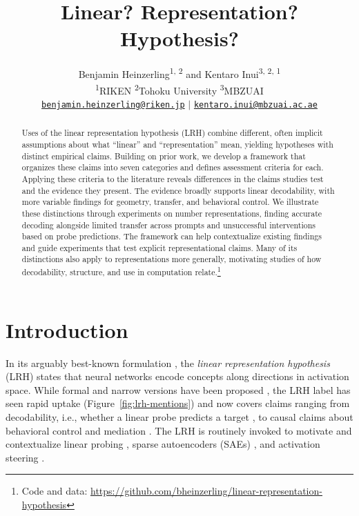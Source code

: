 \documentclass[11pt]{article}
\title{Linear? Representation? Hypothesis?}
\author{%
Benjamin Heinzerling\textsuperscript{\textnormal{1, 2}} \textnormal{and} Kentaro Inui\textsuperscript{\textnormal{3, 2, 1}} \\
\textsuperscript{\textnormal{1}}RIKEN \quad \textsuperscript{\textnormal{2}}Tohoku University \quad \textsuperscript{\textnormal{3}}MBZUAI \\
\hypersetup{urlcolor=black}\href{mailto:benjamin.heinzerling@riken.jp}{\tt benjamin.heinzerling@riken.jp} \hspace{0.06em} $\vert$ \hspace{0.12em} \href{mailto:kentaro.inui@mbzuai.ac.ae}{\tt kentaro.inui@mbzuai.ac.ae}%
}
\newcommand{\LRH}{LRH}
\begin{document}
\maketitle

\begin{abstract}
Uses of the linear representation hypothesis (LRH) combine different, often implicit assumptions about what ``linear'' and ``representation'' mean, yielding hypotheses with distinct empirical claims.
Building on prior work, we develop a framework that organizes these claims into seven categories and defines assessment criteria for each.
Applying these criteria to the literature reveals differences in the claims studies test and the evidence they present.
The evidence broadly supports linear decodability, with more variable findings for geometry, transfer, and behavioral control.
We illustrate these distinctions through experiments on number representations, finding accurate decoding alongside limited transfer across prompts and unsuccessful interventions based on probe predictions.
The framework can help contextualize existing findings and guide experiments that test explicit representational claims.
Many of its distinctions also apply to representations more generally, motivating studies of how decodability, structure, and use in computation relate.\footnote{Code and data: \url{https://github.com/bheinzerling/linear-representation-hypothesis}}
\end{abstract}

\section{Introduction}

In its arguably best-known formulation \citep{elhage2022toy}, the \emph{linear representation hypothesis} (\LRH{}) states that neural networks encode concepts along directions in activation space.
While formal and narrow versions have been proposed \citep{park2024linear,garg2026features}, the LRH label has seen rapid uptake (Figure~\ref{fig:lrh-mentions}) and now covers claims ranging from decodability, i.e., whether a linear probe predicts a target \citep{belinkov2022probing}, to causal claims about behavioral control and mediation \citep{tigges2023linear,arditi2024refusal,geiger2024finding}.
The LRH is routinely invoked to motivate and contextualize linear probing \citep[e.g.,][]{bereska2024mechanistic,jiao2024spin}, sparse autoencoders (SAEs) \citep[e.g.,][]{templeton2024scaling,makelov2024towards}, and activation steering \citep[e.g.,][]{scalena2024multi,wang2025semantics}.
\end{document}
